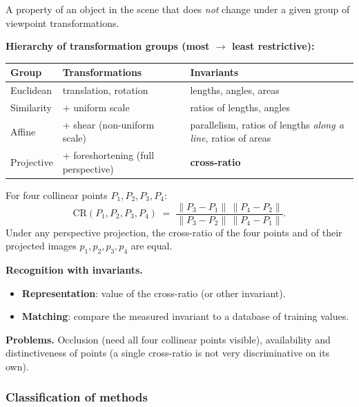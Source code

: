 \begin{defbox}
A property of an object in the scene that does \emph{not} change under a given group of viewpoint transformations.
\end{defbox}

\textbf{Hierarchy of transformation groups (most $\to$ least restrictive):}

\begin{center}
\renewcommand{\arraystretch}{1.3}
\begin{tabular}{@{} l p{4cm} p{5.5cm} @{}}
\toprule
\textbf{Group} & \textbf{Transformations} & \textbf{Invariants} \\
\midrule
Euclidean & translation, rotation & lengths, angles, areas \\
Similarity & + uniform scale & ratios of lengths, angles \\
Affine & + shear (non-uniform scale) & parallelism, ratios of lengths \emph{along a line}, ratios of areas \\
Projective & + foreshortening (full perspective) & \textbf{cross-ratio} \\
\bottomrule
\end{tabular}
\end{center}

\separator

\begin{defbox}
For four collinear points $P_1, P_2, P_3, P_4$:
\[
\mathrm{CR}(P_1, P_2, P_3, P_4) \;=\; \frac{\|P_3 - P_1\|\,\|P_4 - P_2\|}{\|P_3 - P_2\|\,\|P_4 - P_1\|}.
\]
Under any perspective projection, the cross-ratio of the four points and of their projected images $p_1, p_2, p_3, p_4$ are equal.
\end{defbox}

\textbf{Recognition with invariants.}
\begin{itemize}
  \item \textbf{Representation}: value of the cross-ratio (or other invariant).
  \item \textbf{Matching}: compare the measured invariant to a database of training values.
\end{itemize}
\textbf{Problems.} Occlusion (need all four collinear points visible), availability and distinctiveness of points (a single cross-ratio is not very discriminative on its own).

\bigseparator

\subsubsection{Classification of methods}

